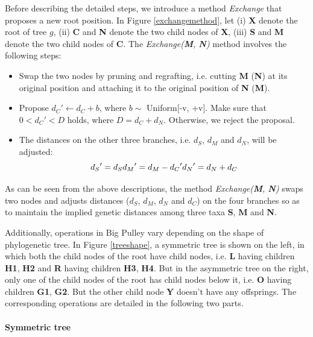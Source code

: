 \documentclass{bmcart}
\begin{document}
Before describing the detailed steps, we introduce a method \textit{Exchange} that proposes a new root position. In Figure \ref{exchangemethod}, let (i) \textbf{X} denote the root of tree $g$, (ii) \textbf{C} and \textbf{N} denote the two child nodes of \textbf{X}, (iii) \textbf{S} and \textbf{M} denote the two child nodes of \textbf{C}. The \textit{Exchange(\textbf{M}, \textbf{N})} method involves the following steps:
\begin{itemize}
\item Swap the two nodes by pruning and regrafting, i.e. cutting \textbf{M} (\textbf{N}) at its original position and attaching it to the original position of \textbf{N} (\textbf{M}).
\item Propose ${d_C}' \leftarrow {d_C} + b$, where $b \sim$ Uniform[-v, +v]. Make sure that $0 < {d_C}' < D$ holds, where $D = {d_C} + {d_{N}}$. Otherwise, we reject the proposal.
\item The distances on the other three branches, i.e. $d_S$, $d_{M}$ and $d_{N}$, will be adjusted:
\begin{equation}\label{big_dis}
{d_S}' = {d_S}\\
{d_{M}}' = {d_{M}} - {d_C}'\\
{d_{N}}' = {d_{N}} + {d_C}
\end{equation}
\end{itemize}

As can be seen from the above descriptions, the method \textit{Exchange(\textbf{M}, \textbf{N})} swaps two nodes and adjusts distances ($d_S$, $d_{M}$, $d_{N}$ and $d_{C}$) on the four branches so as to maintain the implied genetic distances among three taxa \textbf{S}, \textbf{M} and \textbf{N}.

Additionally, operations in Big Pulley vary depending on the shape of phylogenetic tree. In Figure \ref{treeshape}, a symmetric tree is shown on the left, in which both the child nodes of the root have child nodes, i.e. \textbf{L} having children \textbf{H1}, \textbf{H2} and \textbf{R} having children \textbf{H3}, \textbf{H4}. But in the asymmetric tree on the right, only one of the child nodes of the root has child nodes below it, i.e. \textbf{O} having children \textbf{G1}, \textbf{G2}. But the other child node \textbf{Y} doesn't have any offsprings. The corresponding operations are detailed in the following two parts.
\paragraph*{Symmetric tree}
\end{document}
